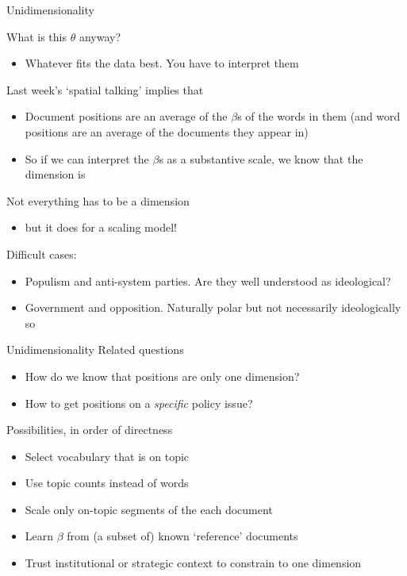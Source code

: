 \documentclass{hertieteaching}
\begin{document}
\begin{frame}{Unidimensionality}

What is this $\theta$ anyway?
\begin{itemize}
  \item Whatever fits the data best. You have to interpret them
\end{itemize}

Last week's `spatial talking' implies that
\begin{itemize}
  \item Document positions are an average of the $\beta$s of the words in them (and word positions are an average of the documents they appear in)
  \item So if we can interpret the $\beta$s as a substantive scale, we know that the dimension is
\end{itemize}
\pause
Not everything has to be a dimension
\begin{itemize}
  \item but it does for a scaling model!
\end{itemize}
Difficult cases:
\begin{itemize}
  \item Populism and anti-system parties. Are they well understood as ideological?
  \item Government and opposition. Naturally polar but not necessarily ideologically so
\end{itemize}


\end{frame}

\begin{frame}{Unidimensionality}
Related questions
\begin{itemize}
  \item How do we know that positions are only one dimension?
  \item How to get positions on a \textit{specific} policy issue?
\end{itemize}

\pause

Possibilities, in order of directness
\begin{itemize}
\item Select vocabulary that is on topic \parencite[e.g. in sentiment analysis;][]{Proksch.etal2019}
\item Use topic counts instead of words \parencite[e.g. RILE;][]{Budge.etal1987} 
\item Scale only on-topic segments of the each document \parencite{Slapin.Proksch2008}
\item Learn $\beta$ from (a subset of) known `reference' documents \parencite[`Wordscores';][]{Laver.etal2003}
\item Trust institutional or strategic context to constrain to one dimension \parencite{Baerg.Lowe2020}
\end{itemize}


\end{frame}
\end{document}
